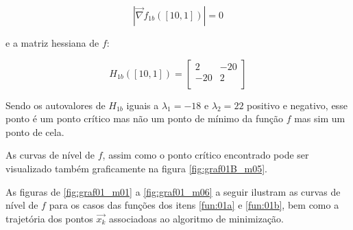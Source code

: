 \documentclass[10pt, a4paper]{article}
\begin{document}
$$|\vec{\nabla} f_{1b}([10, 1])| = 0$$

e a matriz hessiana de $f$:

\[
  H_{1b}([10, 1]) =
  \left[ {\begin{array}{cc}
    2 & -20 \\
    -20 & 2 \\
  \end{array} } \right]
\]

Sendo os autovalores de $H_{1b}$ iguais a $\lambda_{1} = -18$ e $\lambda_{2} = 22$ positivo e negativo, esse ponto \'e um ponto cr\'itico mas n\~ao um ponto de m\'inimo da fun\c c\~ao $f$ mas sim um ponto de cela.

As curvas de n\'ivel de $f$, assim como o ponto cr\'itico encontrado pode ser visualizado tamb\'em graficamente na figura \ref{fig:graf01B_m05}.

As figuras de \ref{fig:graf01_m01} a \ref{fig:graf01_m06} a seguir ilustram as curvas de n\'ivel de $f$ para os casos das fun\c c\~oes dos itens \ref{fun:01a} e \ref{fun:01b}, bem como a trajet\'oria dos pontos $\vec{x_{k}}$ associadoas ao algoritmo de minimiza\c c\~ao.
\end{document}
